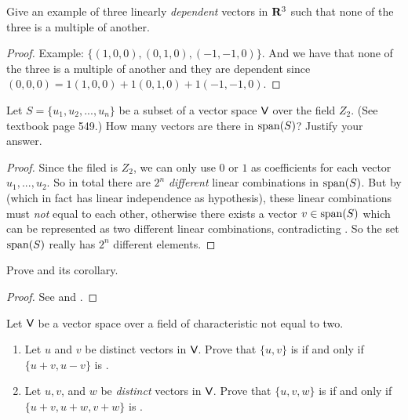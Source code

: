 \begin{exercise} \label{exercise 1.5.10}
Give an example of three linearly \emph{dependent} vectors in \(\mathbf{R}^3\) such that none of the three is a multiple of another.
\end{exercise}

\begin{proof}
Example: \(\{ (1, 0, 0), (0, 1, 0), (-1, -1, 0) \}\).
And we have that none of the three is a multiple of another and they are dependent since \((0, 0, 0) = 1(1, 0, 0) + 1(0, 1, 0) + 1(-1, -1, 0)\).
\end{proof}

\begin{exercise} \label{exercise 1.5.11}
Let \(S = \{ u_1, u_2, ..., u_n \}\) be a \LID{} subset of a vector space \(\textsf{V}\) over the field \(Z_2\).
(See textbook page 549.)
How many vectors are there in \(\operatorname{span}(S)\)?
Justify your answer.
\end{exercise}

\begin{proof}
Since the filed is \(Z_2\), we can only use \(0\) or \(1\) as coefficients for each vector \(u_1, ..., u_2\).
So in total there are \(2^n\) \emph{different} linear combinations in \(\operatorname{span}(S)\).
But by  (which in fact has linear independence as hypothesis), these linear combinations must \emph{not} equal to each other, otherwise there exists a vector \(v \in \operatorname{span}(S)\) which can be represented as two different linear combinations, contradicting .
So the set \(\operatorname{span}(S)\) really has \(2^n\) different elements.
\end{proof}

\begin{exercise} \label{exercise 1.5.12}
Prove  and its corollary.
\end{exercise}

\begin{proof}
See  and .
\end{proof}

\begin{exercise} \label{exercise 1.5.13}
Let \(\textsf{V}\) be a vector space over a field of characteristic not equal to two.
\begin{enumerate}
\item Let \(u\) and \(v\) be distinct vectors in \(\textsf{V}\).
      Prove that \(\{ u, v \}\) is \LID{} if and only if \(\{ u + v, u - v\}\) is \LID{}.
\item Let \(u, v\), and \(w\) be \emph{distinct} vectors in \(\textsf{V}\).
      Prove that \(\{ u, v, w \}\) is \LID{} if and only if \(\{ u + v, u + w, v + w \}\) is \LID{}.
\end{enumerate}
\end{exercise}

